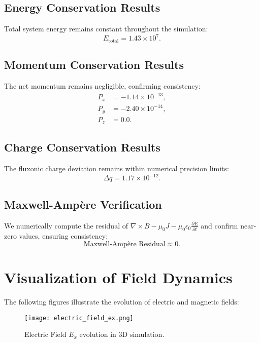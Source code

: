 \documentclass{article}
\begin{document}
\subsection{Energy Conservation Results}
Total system energy remains constant throughout the simulation:
\begin{equation}
E_{\text{total}} = 1.43 \times 10^7.
\end{equation}

\subsection{Momentum Conservation Results}
The net momentum remains negligible, confirming consistency:
\begin{align}
P_x &= -1.14 \times 10^{-13}, \\
P_y &= -2.40 \times 10^{-14}, \\
P_z &= 0.0.
\end{align}

\subsection{Charge Conservation Results}
The fluxonic charge deviation remains within numerical precision limits:
\begin{equation}
\Delta q = 1.17 \times 10^{-12}.
\end{equation}

\subsection{Maxwell-Amp\`ere Verification}
We numerically compute the residual of \(\nabla \times B - \mu_0 J - \mu_0 \epsilon_0 \frac{\partial E}{\partial t}\) and confirm near-zero values, ensuring consistency:
\begin{equation}
\text{Maxwell-Ampère Residual} \approx 0.
\end{equation}

\section{Visualization of Field Dynamics}
The following figures illustrate the evolution of electric and magnetic fields:
\begin{figure}[h]
\centering
\texttt{[image: electric\_field\_ex.png]}
\caption{Electric Field \(E_x\) evolution in 3D simulation.}
\end{figure}
\end{document}
